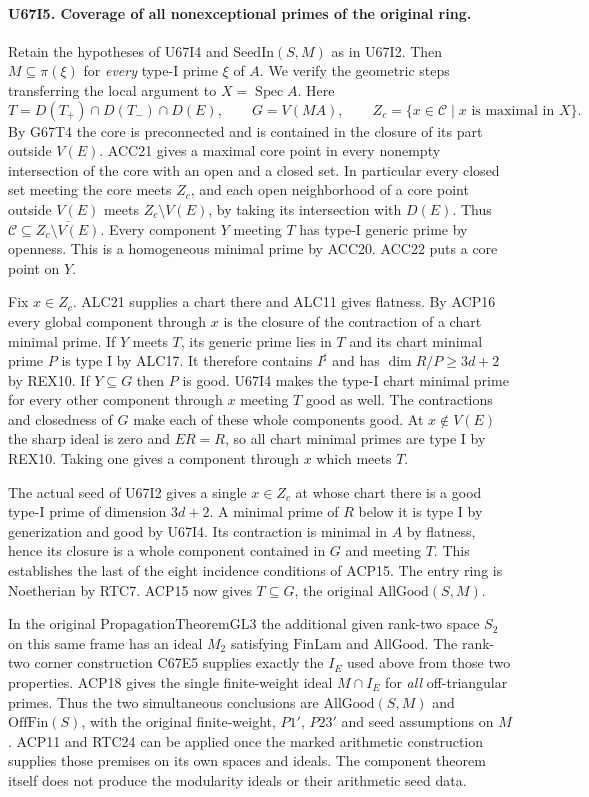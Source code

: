 \paragraph{U67I5. Coverage of all nonexceptional primes of the original ring.}
Retain the hypotheses of U67I4 and $\mathrm{SeedIn}(S,M)$ as in
U67I2. Then $M\subseteq\pi(\xi)$ for \emph{every} type-I prime
$\xi$ of $A$. We verify the geometric steps transferring
the local argument to $X=\operatorname{Spec}A$. Here
\[
 T=D(T_+)\cap D(T_-)\cap D(E),\qquad G=V(MA),\qquad
 Z_c=\{x\in\mathcal C\mid x\text{ is maximal in }X\}.
\]
By G67T4 the core is preconnected and is contained in the closure of
its part outside $V(E)$. ACC21 gives a maximal core point in
every nonempty intersection of the core with an open and a closed
set. In particular every closed set meeting the core meets $Z_c$,
and each open neighborhood of a core point outside $V(E)$
meets $Z_c\setminus V(E)$, by taking its intersection with
$D(E)$. Thus $\mathcal C\subseteq\overline{Z_c\setminus V(E)}$.
Every component $Y$ meeting $T$ has type-I generic prime by
openness. This is a homogeneous minimal prime by ACC20. ACC22
puts a core point on $Y$.

Fix $x\in Z_c$. ALC21 supplies a chart there and ALC11 gives
flatness. By ACP16 every global component through $x$ is the
closure of the contraction of a chart minimal prime. If $Y$
meets $T$, its generic prime lies in $T$ and its chart minimal
prime $P$ is type I by ALC17. It therefore contains $I^\sharp$
and has $\dim R/P\ge3d+2$ by REX10. If $Y\subseteq G$ then
$P$ is good. U67I4 makes the type-I chart minimal prime for
every other component through $x$ meeting $T$ good as well.
The contractions and closedness of $G$ make each of these whole
components good. At $x\notin V(E)$ the sharp ideal is zero and
$ER=R$, so all chart minimal primes are type I by REX10.
Taking one gives a component through $x$ which meets $T$.

The actual seed of U67I2 gives a single $x\in Z_c$ at whose
chart there is a good type-I prime of dimension $3d+2$. A
minimal prime of $R$ below it is type I by generization and good
by U67I4. Its contraction is minimal in $A$ by flatness, hence
its closure is a whole component contained in $G$ and meeting
$T$. This establishes the last of the eight incidence conditions
of ACP15. The entry ring is Noetherian by RTC7. ACP15 now
gives $T\subseteq G$, the original $\mathrm{AllGood}(S,M)$.

In the original $\mathrm{PropagationTheoremGL3}$ the additional
given rank-two space $S_2$ on this same frame has an ideal $M_2$
satisfying $\mathrm{FinLam}$ and $\mathrm{AllGood}$. The rank-two
corner construction C67E5 supplies exactly the $I_E$
used above from those two properties. ACP18 gives the single
finite-weight ideal $M\cap I_E$ for \emph{all} off-triangular
primes. Thus the two simultaneous conclusions are
$\mathrm{AllGood}(S,M)$ and $\mathrm{OffFin}(S)$, with the
original finite-weight, $P1'$, $P23'$ and seed assumptions on $M$.
ACP11 and RTC24 can be applied once the marked arithmetic
construction supplies those premises on its own spaces and ideals.
The component theorem itself does not produce the modularity
ideals or their arithmetic seed data.
